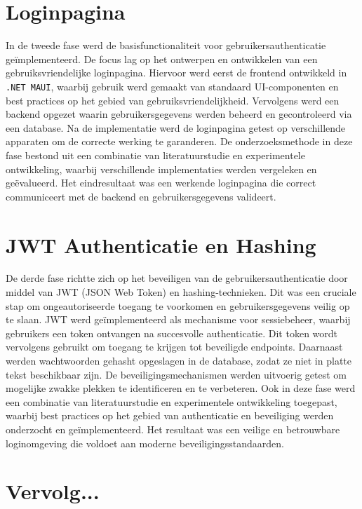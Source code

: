 \section{Loginpagina}

In de tweede fase werd de basisfunctionaliteit voor gebruikersauthenticatie geïmplementeerd. De focus lag op het ontwerpen en ontwikkelen van een gebruiksvriendelijke loginpagina. Hiervoor werd eerst de frontend ontwikkeld in \texttt{.NET MAUI}, waarbij gebruik werd gemaakt van standaard UI-componenten en best practices op het gebied van gebruiksvriendelijkheid. Vervolgens werd een backend opgezet waarin gebruikersgegevens werden beheerd en gecontroleerd via een database. Na de implementatie werd de loginpagina getest op verschillende apparaten om de correcte werking te garanderen. De onderzoeksmethode in deze fase bestond uit een combinatie van literatuurstudie en experimentele ontwikkeling, waarbij verschillende implementaties werden vergeleken en geëvalueerd. Het eindresultaat was een werkende loginpagina die correct communiceert met de backend en gebruikersgegevens valideert.

\section{JWT Authenticatie en Hashing}

De derde fase richtte zich op het beveiligen van de gebruikersauthenticatie door middel van JWT (JSON Web Token) en hashing-technieken. Dit was een cruciale stap om ongeautoriseerde toegang te voorkomen en gebruikersgegevens veilig op te slaan. JWT werd geïmplementeerd als mechanisme voor sessiebeheer, waarbij gebruikers een token ontvangen na succesvolle authenticatie. Dit token wordt vervolgens gebruikt om toegang te krijgen tot beveiligde endpoints. Daarnaast werden wachtwoorden gehasht opgeslagen in de database, zodat ze niet in platte tekst beschikbaar zijn. De beveiligingsmechanismen werden uitvoerig getest om mogelijke zwakke plekken te identificeren en te verbeteren. Ook in deze fase werd een combinatie van literatuurstudie en experimentele ontwikkeling toegepast, waarbij best practices op het gebied van authenticatie en beveiliging werden onderzocht en geïmplementeerd. Het resultaat was een veilige en betrouwbare loginomgeving die voldoet aan moderne beveiligingsstandaarden.

\section{Vervolg...}







